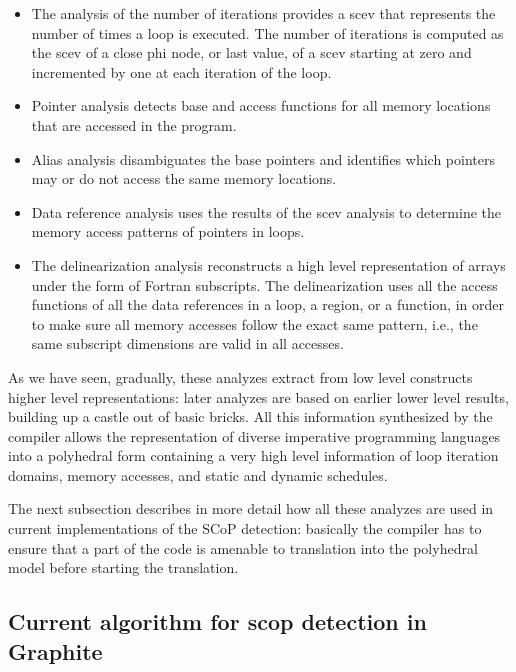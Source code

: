 \documentclass{sigplanconf}
\begin{document}
\begin{itemize}
\item The analysis of the number of iterations \cite{scev} provides a scev that
  represents the number of times a loop is executed.  The number of iterations
  is computed as the scev of a close phi node, or last value, of a scev starting
  at zero and incremented by one at each iteration of the loop.

\item Pointer analysis detects base and access functions for all memory
  locations that are accessed in the program.

\item Alias analysis disambiguates the base pointers and identifies which
  pointers may or do not access the same memory locations.

\item Data reference analysis uses the results of the scev analysis to determine
  the memory access patterns of pointers in loops.

\item The delinearization analysis \cite{delinearization1, delinearization2}
  reconstructs a high level representation of arrays under the form of Fortran
  subscripts.  The delinearization uses all the access functions of all the data
  references in a loop, a region, or a function, in order to make sure all
  memory accesses follow the exact same pattern, i.e., the same subscript
  dimensions are valid in all accesses.
\end{itemize}

As we have seen, gradually, these analyzes extract from low level constructs
higher level representations: later analyzes are based on earlier lower level
results, building up a castle out of basic bricks.  All this information
synthesized by the compiler allows the representation of diverse imperative
programming languages into a polyhedral form \cite{Girbal} containing a very
high level information of loop iteration domains, memory accesses, and static
and dynamic schedules.

The next subsection describes in more detail how all these analyzes are used in
current implementations of the SCoP detection: basically the compiler has to
ensure that a part of the code is amenable to translation into the polyhedral
model before starting the translation.

\subsection{Current algorithm for scop detection in Graphite}
\end{document}
